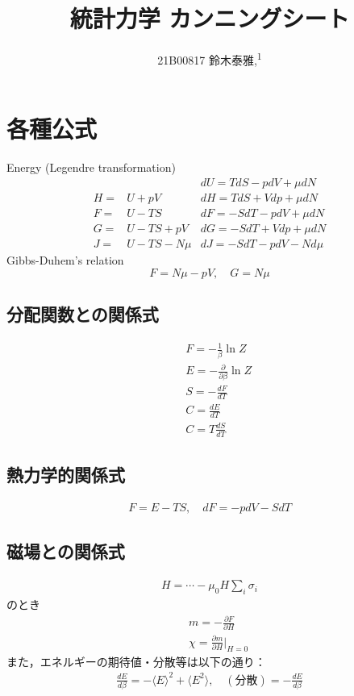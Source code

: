\documentclass[12pt,dvipdfmx]{jsarticle}
\newcommand\authormark[1]{\textsuperscript{#1}}
\begin{document}
\title{統計力学 カンニングシート}

\author{21B00817 鈴木泰雅,\authormark{1}}
\section*{\Large{各種公式}}
Energy (Legendre transformation)
\begin{align}
    & & dU=TdS-pdV+\mu dN \\
    H =&U +pV & dH = TdS + Vdp + \mu dN\\
    F =&U -TS & dF = -SdT -pdV + \mu dN\\
    G =&U -TS + pV & dG = -SdT + Vdp + \mu dN\\
    J =&U-TS-N\mu & dJ = -SdT-pdV-Nd\mu
\end{align}
Gibbs-Duhem's relation
\begin{equation}
    F = N\mu-pV,\quad G = N\mu
\end{equation}
\subsection*{分配関数との関係式}
\begin{eqnarray}
  &&F = -\frac{1}{\beta}\ln Z\\
  &&E = -\frac{\partial}{\partial\beta}\ln Z\\
  &&S = -\frac{dF}{dT}\\
  &&C = \frac{dE}{dT}\\
  &&C = T\frac{dS}{dT}
\end{eqnarray}
\subsection*{熱力学的関係式}
\begin{eqnarray}
  F = E-TS,\quad dF = -pdV -SdT 
\end{eqnarray}
\subsection*{磁場との関係式}
\begin{eqnarray}
  H = \cdots - \mu_0H\sum_i \sigma_i
\end{eqnarray}
のとき
\begin{eqnarray}
  &&m= -\frac{\partial F}{\partial H}\\
  &&\chi = \frac{\partial m}{\partial H}|_{H=0}
\end{eqnarray}
また，エネルギーの期待値・分散等は以下の通り：
\begin{eqnarray}
  \frac{d E}{d\beta} = - \langle E\rangle^2 + \langle E^2 \rangle,\quad (分散) = - \frac{dE}{d\beta}
\end{eqnarray}
\end{document}
